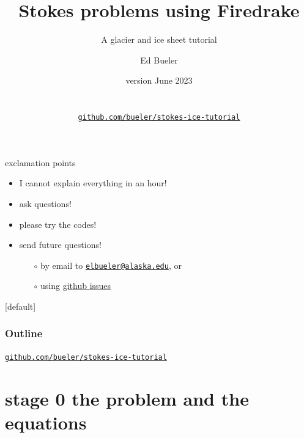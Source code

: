 \documentclass[10pt,
               hyperref={colorlinks,citecolor=DeepPink4,linkcolor=black,urlcolor=blue},
               svgnames]{beamer}
\title{Stokes problems using Firedrake}
\subtitle{A glacier and ice sheet tutorial}
\author{Ed Bueler}
\institute[UAF]{University of Alaska Fairbanks}
\date[June 2023]{version June 2023  \\ \phantom{foo} \\ \phantom{foo} \\
\large \href{https://github.com/bueler/stokes-ice-tutorial}{\texttt{github.com/bueler/stokes-ice-tutorial}} }
\begin{document}
\beamertemplatenavigationsymbolsempty

\begin{frame}
  \maketitle
\end{frame}


\begin{frame}{exclamation points}

\begin{itemize}
\item \alert{I cannot explain everything in an hour!}

\item \alert{ask questions!}

\item \alert{please try the codes!}

\item \alert{send future questions!}
  \begin{itemize}
  \item[$\circ$] by email to \href{mailto:elbueler@alaska.edu}{\texttt{elbueler@alaska.edu}}, or
  \item[$\circ$] using \href{https://github.com/bueler/stokes-ice-tutorial/issues}{github issues}
  \end{itemize}
\end{itemize}
\end{frame}


[default] 

\begin{frame}
  \frametitle{Outline}

\centerline{\large \href{https://github.com/bueler/stokes-ice-tutorial}{\texttt{github.com/bueler/stokes-ice-tutorial}}}

\bigskip
  \tableofcontents[hideallsubsections]
\end{frame}


\section{stage 0 \hspace{9.3mm} the problem and the equations}
\end{document}

